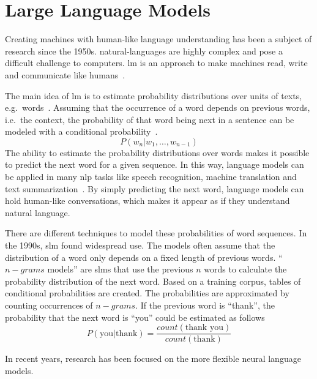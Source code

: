 \chapter{Large Language Models}\label{ch:techOverview}

Creating machines with human-like language understanding has been a subject of research since the 1950s.
\gls{natural-language}s are highly complex and pose a difficult challenge to computers.
\gls{lm} is an approach to make machines read, write and communicate like humans~\autocite{zhao2023survey}.

The main idea of \gls{lm} is to estimate probability distributions over units of texts, e.g.\ words~\autocite{de2015survey}.
Assuming that the occurrence of a word depends on previous words, i.e.\ the context, the probability of that word being next in a sentence can be modeled with a conditional probability~\autocite{jozefowicz2016exploring}.
\[
    P(w_n | w_1, \dots , w_{n-1})
\]
The ability to estimate the probability distributions over words makes it possible to predict the next word for a given sequence.
In this way, language models can be applied in many \gls{nlp} tasks like speech recognition, machine translation and text summarization~\autocite{jozefowicz2016exploring}.
By simply predicting the next word, language models can hold human-like conversations, which makes it appear as if they understand natural language.

There are different techniques to model these probabilities of word sequences.
In the 1990s, \gls{slm} found widespread use.
The models often assume that the distribution of a word only depends on a fixed length of previous words.
\enquote{$n-grams$ models} are \gls{slm}s that use the previous $n$ words to calculate the probability distribution of the next word.
Based on a training corpus, tables of conditional probabilities are created.
The probabilities are approximated by counting occurrences of $n-grams$.
If the previous word is \enquote{thank}, the probability that the next word is \enquote{you} could be estimated as follows~\autocite{quadarLM2020}
\[
    P(\text{you} | \text{thank}) = \frac{count(\text{thank you})}{count(\text{thank})}
\]

In recent years, research has been focused on the more flexible neural language models.


